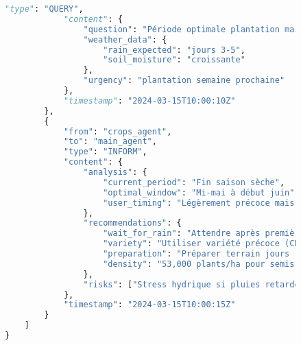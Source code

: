 \begin{figure}[H]
\begin{lstlisting}[language=Python, caption=Exemples de communications inter-agents en action]
            "type": "QUERY",
            "content": {
                "question": "Période optimale plantation maïs Garoua?",
                "weather_data": {
                    "rain_expected": "jours 3-5",
                    "soil_moisture": "croissante"
                },
                "urgency": "plantation semaine prochaine"
            },
            "timestamp": "2024-03-15T10:00:10Z"
        },
        {
            "from": "crops_agent",
            "to": "main_agent",
            "type": "INFORM",
            "content": {
                "analysis": {
                    "current_period": "Fin saison sèche",
                    "optimal_window": "Mi-mai à début juin",
                    "user_timing": "Légèrement précoce mais acceptable"
                },
                "recommendations": {
                    "wait_for_rain": "Attendre après premières pluies (jour 3-4)",
                    "variety": "Utiliser variété précoce (CMS 8704)",
                    "preparation": "Préparer terrain jours 1-2",
                    "density": "53,000 plants/ha pour semis précoce"
                },
                "risks": ["Stress hydrique si pluies retardées"]
            },
            "timestamp": "2024-03-15T10:00:15Z"
        }
    ]
}


\end{lstlisting}
\end{figure}
